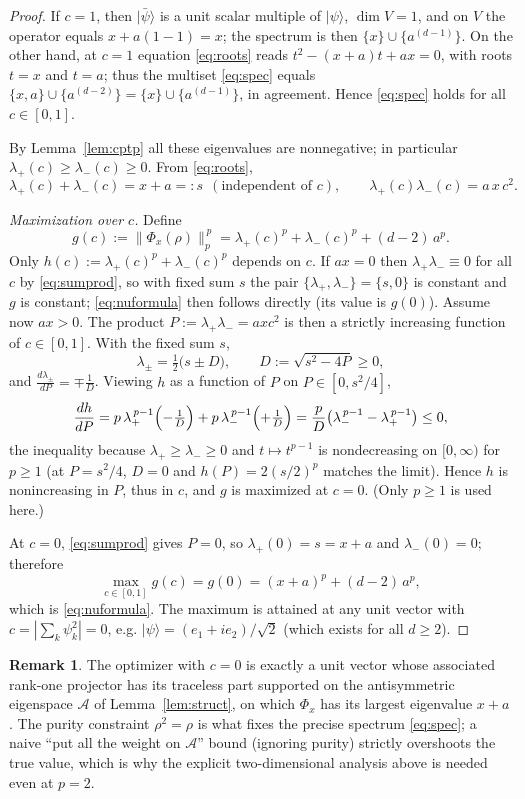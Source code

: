 \documentclass{amsart}
\theoremstyle{definition}
\newtheorem{remark}{Remark}
\begin{document}
\begin{proof}
If $c=1$, then $|\bar\psi\rangle$ is a unit scalar multiple of $|\psi\rangle$,
$\dim V=1$, and on $V$ the operator equals $x+a(1-1)=x$; the spectrum is then
$\{x\}\cup\{a^{(d-1)}\}$. On the other hand, at $c=1$ equation \eqref{eq:roots}
reads $t^{2}-(x+a)t+ax=0$, with roots $t=x$ and $t=a$; thus the multiset
\eqref{eq:spec} equals $\{x,a\}\cup\{a^{(d-2)}\}=\{x\}\cup\{a^{(d-1)}\}$, in
agreement. Hence \eqref{eq:spec} holds for all $c\in[0,1]$.

By Lemma~\ref{lem:cptp} all these eigenvalues are nonnegative; in particular
$\lambda_+(c)\ge\lambda_-(c)\ge0$. From \eqref{eq:roots},
\begin{equation}\label{eq:sumprod}
\lambda_+(c)+\lambda_-(c)=x+a=:s\ \ (\text{independent of }c),\qquad
\lambda_+(c)\lambda_-(c)=a\,x\,c^{2}.
\end{equation}

\emph{Maximization over $c$.} Define
\[
g(c):=\|\Phi_x(\rho)\|_p^{\,p}
=\lambda_+(c)^{p}+\lambda_-(c)^{p}+(d-2)\,a^{p}.
\]
Only $h(c):=\lambda_+(c)^{p}+\lambda_-(c)^{p}$ depends on $c$. If $ax=0$ then
$\lambda_+\lambda_-\equiv0$ for all $c$ by \eqref{eq:sumprod}, so with fixed sum
$s$ the pair $\{\lambda_+,\lambda_-\}=\{s,0\}$ is constant and $g$ is constant;
\eqref{eq:nuformula} then follows directly (its value is $g(0)$). Assume now
$ax>0$. The product $P:=\lambda_+\lambda_-=axc^{2}$ is then a strictly
increasing function of $c\in[0,1]$. With the fixed sum $s$,
\[
\lambda_\pm=\tfrac12\bigl(s\pm D\bigr),\qquad D:=\sqrt{s^{2}-4P}\ge0,
\]
and $\tfrac{d\lambda_\pm}{dP}=\mp\tfrac1D$. Viewing $h$ as a function of $P$ on
$P\in[0,s^2/4]$,
\[
\frac{dh}{dP}
=p\,\lambda_+^{\,p-1}\Bigl(-\tfrac1D\Bigr)
+p\,\lambda_-^{\,p-1}\Bigl(+\tfrac1D\Bigr)
=\frac{p}{D}\bigl(\lambda_-^{\,p-1}-\lambda_+^{\,p-1}\bigr)\le0 ,
\]
the inequality because $\lambda_+\ge\lambda_-\ge0$ and $t\mapsto t^{p-1}$ is
nondecreasing on $[0,\infty)$ for $p\ge1$ (at $P=s^2/4$, $D=0$ and
$h(P)=2(s/2)^p$ matches the limit). Hence $h$ is nonincreasing in $P$, thus in
$c$, and $g$ is maximized at $c=0$. (Only $p\ge1$ is used here.)

At $c=0$, \eqref{eq:sumprod} gives $P=0$, so $\lambda_+(0)=s=x+a$ and
$\lambda_-(0)=0$; therefore
\[
\max_{c\in[0,1]}g(c)=g(0)=(x+a)^{p}+(d-2)\,a^{p},
\]
which is \eqref{eq:nuformula}. The maximum is attained at any unit vector with
$c=|\sum_k\psi_k^{2}|=0$, e.g. $|\psi\rangle=(e_1+ie_2)/\sqrt2$ (which exists for
all $d\ge2$).
\end{proof}

\begin{remark}
The optimizer with $c=0$ is exactly a unit vector whose associated rank-one
projector has its traceless part supported on the antisymmetric eigenspace
$\mathcal A$ of Lemma~\ref{lem:struct}, on which $\Phi_x$ has its largest
eigenvalue $x+a$. The purity constraint $\rho^2=\rho$ is what fixes the precise
spectrum \eqref{eq:spec}; a naive ``put all the weight on $\mathcal A$'' bound
(ignoring purity) strictly overshoots the true value, which is why the explicit
two-dimensional analysis above is needed even at $p=2$.
\end{remark}
\end{document}
